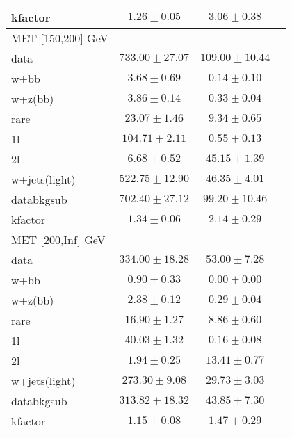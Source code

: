 \begin{table}
\begin{center}
\begin{tabular}{lccc}
kfactor&$1.26\pm0.05$&$3.06\pm0.38$\\
\hline\hline
\hline
MET [150,200] GeV   & &\\
\hline
data&$733.00\pm27.07$&$109.00\pm10.44$\\
\hline
w+bb&$3.68\pm0.69$&$0.14\pm0.10$\\
w+z(bb)&$3.86\pm0.14$&$0.33\pm0.04$\\
rare&$23.07\pm1.46$&$9.34\pm0.65$\\
1l&$104.71\pm2.11$&$0.55\pm0.13$\\
2l&$6.68\pm0.52$&$45.15\pm1.39$\\
w+jets(light)&$522.75\pm12.90$&$46.35\pm4.01$\\
\hline
databkgsub&$702.40\pm27.12$&$99.20\pm10.46$\\
kfactor&$1.34\pm0.06$&$2.14\pm0.29$\\
\hline\hline
\hline
MET [200,Inf] GeV & &\\
\hline
data&$334.00\pm18.28$&$53.00\pm7.28$\\
\hline
w+bb&$0.90\pm0.33$&$0.00\pm0.00$\\
w+z(bb)&$2.38\pm0.12$&$0.29\pm0.04$\\
rare&$16.90\pm1.27$&$8.86\pm0.60$\\
1l&$40.03\pm1.32$&$0.16\pm0.08$\\
2l&$1.94\pm0.25$&$13.41\pm0.77$\\
w+jets(light)&$273.30\pm9.08$&$29.73\pm3.03$\\
\hline
databkgsub&$313.82\pm18.32$&$43.85\pm7.30$\\
kfactor&$1.15\pm0.08$&$1.47\pm0.29$\\
\hline\hline
\hline
\end{tabular}
\end{center}
\end{table}
